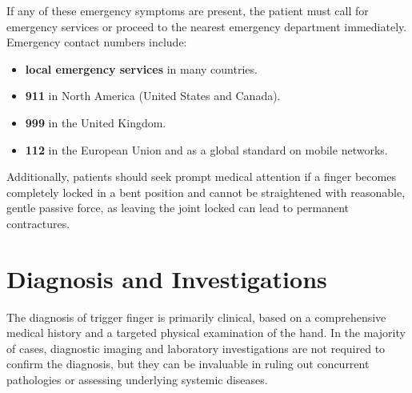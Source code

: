 If any of these emergency symptoms are present, the patient must call for emergency services or proceed to the nearest emergency department immediately. Emergency contact numbers include:
\begin{itemize}
  \item \textbf{local emergency services} in many countries.
  \item \textbf{911} in North America (United States and Canada).
  \item \textbf{999} in the United Kingdom.
  \item \textbf{112} in the European Union and as a global standard on mobile networks.
\end{itemize}

Additionally, patients should seek prompt medical attention if a finger becomes completely locked in a bent position and cannot be straightened with reasonable, gentle passive force, as leaving the joint locked can lead to permanent contractures.

\section*{Diagnosis and Investigations}
The diagnosis of trigger finger is primarily clinical, based on a comprehensive medical history and a targeted physical examination of the hand. In the majority of cases, diagnostic imaging and laboratory investigations are not required to confirm the diagnosis, but they can be invaluable in ruling out concurrent pathologies or assessing underlying systemic diseases.

